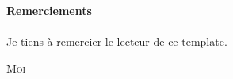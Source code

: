 


\begin{center}
	\LARGE{\textbf{Remerciements}}\\[1cm]
\end{center}


\large{ \paragraph{}
Je tiens à remercier le lecteur de ce template.
}

\begin{flushright}
	\textsc{Moi}\\
\end{flushright}

\newpage
